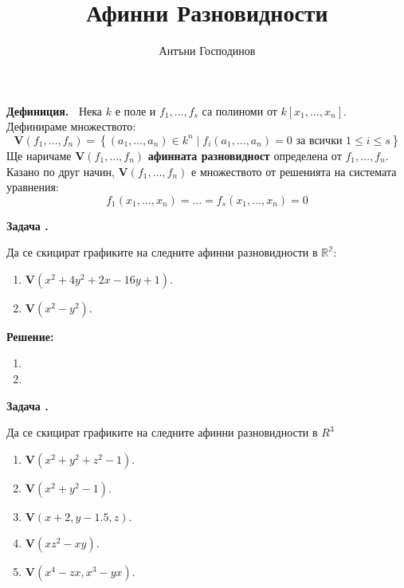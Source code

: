 \documentclass[a4paper,12pt,fleqn]{article}
\title{Афинни Разновидности}
\author{Антъни Господинов}
\date{}
\newcounter{problem}
\newcommand\problem{%
  \stepcounter{problem}%
  \textbf{Задача \theproblem.}~%
}
\newcommand\solution{%
  \textbf{Решение:}~%
}
\begin{document}
    \maketitle
    \textbf{Дефиниция.~} Нека \( k \) е поле и \( f_{1},\dots,f_{s} \) са полиноми от \( k \left[ x_{1},\dots,x_{n} \right] \). Дефинираме множеството: 
    \begin{equation*}
        \mathbf{V}\left( f_{1},\dots,f_{n} \right)=\left\{ \left( a_{1},\dots,a_{n} \right) \in k^{n} \mid f_{i}(a_{1},\dots,a_{n})=0 \textit{ за всички } 1 \leq i \leq s \right\}
    \end{equation*}
    Ще наричаме \( \textbf{V}\left( f_{1},\dots,f_{n} \right) \) \textbf{афинната разновидност} определена от \( f_{1},\dots,f_{n} \). Казано по друг начин, \( \textbf{V}\left( f_{1},\dots,f_{n} \right) \) е множеството от решенията на системата уравнения: 
    \begin{equation*}
        f_{1}(x_{1},\dots,x_{n}) = \dots = f_{s}(x_{1},\dots,x_{n}) = 0
    \end{equation*} 

    \problem{Да се скицират графиките на следните афинни разновидности в \( \mathbb{R^{2}} \):
    \begin{enumerate}
        \item \( \mathbf{V}(x^{2}+4y^{2}+2x-16y+1) \).
        \item \( \mathbf{V}(x^{2}-y^{2}) \).
    \end{enumerate}
    }

    \solution{
        \begin{enumerate}
            \item 
                \begin{minipage}[t]{\linewidth}
                    \raggedright
                \end{minipage}
                \item 
                \begin{minipage}[t]{\linewidth}
                    \raggedright
                \end{minipage}
        \end{enumerate} 
    }

    \problem{Да се скицират графиките на следните афинни разновидности в \( R^{3} \)
    \begin{enumerate}
        \item \( \mathbf{V}(x^{2}+y^{2}+z^{2}-1) \).
        \item \( \mathbf{V}(x^{2}+y^{2}-1) \).
        \item \( \mathbf{V}(x+2,y-1.5,z) \).
        \item \( \mathbf{V}(xz^{2}-xy) \).
        \item \( \mathbf{V}(x^{4}-zx,x^{3}-yx) \).
    \end{enumerate}}
\end{document}
